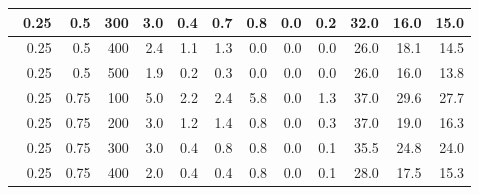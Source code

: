 \begin{longtable}{|r|r|r|r|r|r|r|r|r|r|r|r|}
    \hline \
    0.25                           & 0.5                     & 300                       & 3.0                       & 0.4                       & 0.7                       & 0.8                       & 0.0                       & 0.2                       & 32.0                      & 16.0                      & 15.0                      \\
    \hline \
    0.25                           & 0.5                    & 400                       & 2.4                       & 1.1                       & 1.3                       & 0.0                       & 0.0                       & 0.0                       & 26.0                      & 18.1                      & 14.5                      \\
    \hline \
    0.25                           & 0.5                    & 500                       & 1.9                       & 0.2                       & 0.3                       & 0.0                       & 0.0                       & 0.0                       & 26.0                      & 16.0                      & 13.8                      \\
    \hline \
    0.25                           & 0.75                    & 100                       & 5.0                       & 2.2                       & 2.4                       & 5.8                       & 0.0                       & 1.3                       & 37.0                      & 29.6                      & 27.7                      \\
    \hline \
    0.25                           & 0.75                    & 200                       & 3.0                       & 1.2                       & 1.4                       & 0.8                       & 0.0                       & 0.3                       & 37.0                      & 19.0                      & 16.3                      \\
    \hline \
    0.25                           & 0.75                    & 300                       & 3.0                       & 0.4                       & 0.8                       & 0.8                       & 0.0                       & 0.1                       & 35.5                      & 24.8                       & 24.0                       \\
    \hline \
    0.25                           & 0.75                     & 400                       & 2.0                       & 0.4                       & 0.4                       & 0.8                       & 0.0                       & 0.1                       & 28.0                      & 17.5                      & 15.3                      \\

\end{longtable}
